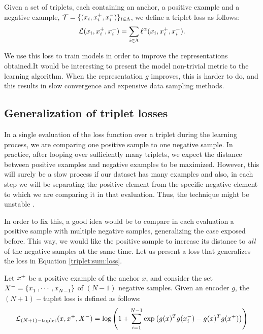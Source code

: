 \begin{ndef}
Given a set of triplets, each containing an anchor, a positive example and a negative example, $\mathcal T = \{(x_i,x^+_i,x^-_i)\}_{i \in \Lambda}$, we define a triplet loss as follows:
\begin{equation}\label{triplet:sum:loss}
\mathcal L (x_i,x^+_i,x^-_i) = \sum_{i \in \Lambda} \ell^\alpha(x_i,x^+_i,x^-_i).
\end{equation}

\end{ndef}



We use this loss to train models in order to improve the representations obtained.It would be interesting to present the model non-trivial metric to the learning algorithm. When the representation $g$ improves, this is harder to do, and this results in slow convergence and expensive data sampling methods.

\subsection*{Generalization of triplet losses}

In a single evaluation of the loss function over a triplet during the learning process, we are comparing one positive sample to one negative sample. In practice, after looping over sufficiently many triplets, we expect the distance between positive examples and negative examples to be maximized. However, this will surely be a slow process if our dataset has many examples and also, in each step we will be separating the positive element from the specific negative element to which we are comparing it in that evaluation. Thus, the technique might be unstable \citep{Sohn2016ImprovedDM}.

In order to fix this, a good idea would be to compare in each evaluation a positive sample with multiple negative samples, generalizing the case exposed before. This way, we would like the positive sample to increase its distance to \emph{all} of the negative samples at the same time. Let us present a loss that generalizes the loss in Equation \eqref{triplet:sum:loss}.

\begin{ndef}
Let $x^+$ be a positive example of the anchor $x$, and consider the set $X^- = \{x^-_1,\cdots,x^-_{N-1}\}$ of $(N-1)$ negative samples. Given an encoder $g$, the $(N+1)-$tuplet loss is defined as follows:
\begin{equation}\label{nplus1:tuplet:loss}
\mathcal L_{(N+1)-\text{tuplet}}(x,x^+,X^-) = \log \left( 1+ \sum_{i=1}^{N-1} \exp \left(g(x)^T g(x^-_i) - g(x)^T g(x^+)\right)\right) 
\end{equation}
\end{ndef}

